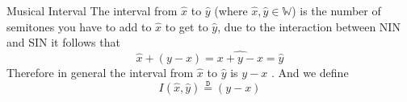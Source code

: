 \documentclass{standalone}
\begin{document}
\begin{defn*}{Musical Interval}
  The interval from  $ \widehat{x}$ to $ \widehat{y }$ (where $ \widehat{x}, \widehat{y} \in \mathbb{W}$) is the number of semitones you have to add to $ \widehat{x}$ to get to $ \widehat{y}$, due to the interaction between NIN and SIN it follows that 
  \[
    \widehat{x}  +  \left( y  -  x \right) = \widehat{x  +  y  -  x} = \widehat{y}
  \]
  Therefore in general the interval from $ \widehat{x}$  to $ \widehat{y}$ is $y  - x$ . And we define 
  \[
    I\left( \widehat{x}, \widehat{y}\right) \stackrel{\mathtt{D}}{=} (y  -  x) 
  \]
  
\end{defn*}
\end{document}
